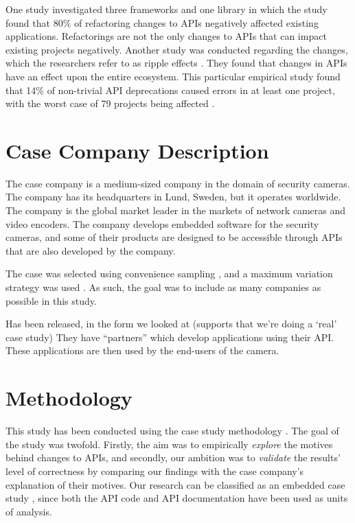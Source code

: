 \documentclass[conference]{IEEEtran}
\begin{document}
One study \cite{dig2005role} investigated three frameworks and one library in which the study found that 80\% of refactoring changes to APIs negatively affected existing applications. Refactorings are not the only changes to APIs that can impact existing projects negatively. Another study was conducted regarding the changes, which the researchers refer to as ripple effects \cite{robbes2012developers}. They found that changes in APIs have an effect upon the entire ecosystem. This particular empirical study found that 14\% of non-trivial API deprecations caused errors in at least one project, with the worst case of 79 projects being affected \cite{robbes2012developers}.


\section{Case Company Description} \label{case_company_description}
The case company is a medium-sized company in the domain of security cameras. The company has its headquarters in Lund, Sweden, but it operates worldwide. The company is the global market leader in the markets of network cameras and video encoders. The company develops embedded software for the security cameras, and some of their products are designed to be accessible through APIs that are also developed by the company. 


The case was selected using convenience sampling \cite{flyvbjerg2006five}, and a maximum variation strategy was used \cite{benbasat1987case}. As such, the goal was to include as many companies as possible in this study.


Has been released, in the form we looked at (supports that we’re doing a ‘real’ case study)
They have “partners” which develop applications using their API. These applications are then used by the end-users of the camera. 


\section{Methodology} \label{methodology}
This study has been conducted using the case study methodology \cite{runeson2009guidelines}. The goal of the study was twofold. Firstly, the aim was to empirically \textit{explore} the motives behind changes to APIs, and secondly, our ambition was to \textit{validate} the results' level of correctness by comparing our findings with the case company's explanation of their motives. Our research can be classified as an embedded case study \cite{yin2013case}, since both the API code and API documentation have been used as units of analysis. 
\end{document}

